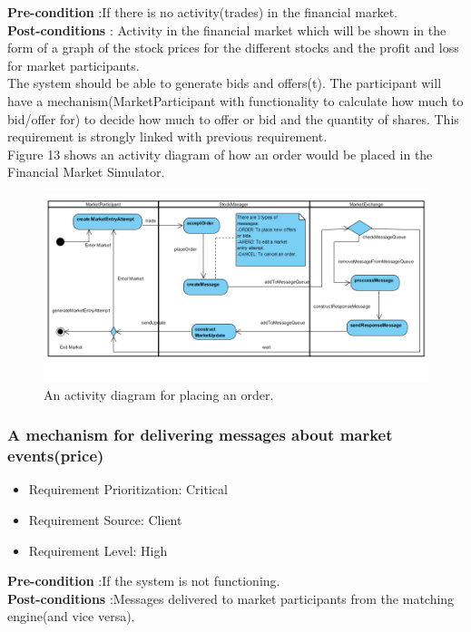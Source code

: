 \documentclass[12pt]{article}
\begin{document}
				\textbf{Pre-condition} :If there is no activity(trades) in the financial market.\\
				\textbf{Post-conditions} : Activity in the financial market which will be shown in the form of a graph of the stock prices for the different stocks and the profit and loss for market participants.\\ 
								
				The system should be able to generate bids and offers(t). The participant will have a mechanism(MarketParticipant with functionality to calculate how much to bid/offer for) to decide how much to offer or bid and the quantity of shares. This requirement is strongly linked with previous requirement.\\
				
				Figure 13 shows an activity diagram of how an order would be placed in the Financial Market Simulator.	 
				
			\begin{figure}[th!]
			\centering
			\includegraphics[scale=0.7]{./placeOrder_activity}
			\caption{An activity diagram for placing an order.}
			\label{domain objects}
			\end{figure}
			\pagebreak			 
			\subsubsection{A mechanism for delivering messages about market events(price)}
			\begin{itemize}
					\item Requirement Prioritization: Critical
					\item Requirement Source: Client 
					\item Requirement Level: High	
			\end{itemize}
			
			\textbf{Pre-condition} :If the system is not functioning.\\
			\textbf{Post-conditions} :Messages delivered to market participants from the matching engine(and vice versa).\\ 
			
\end{document}
